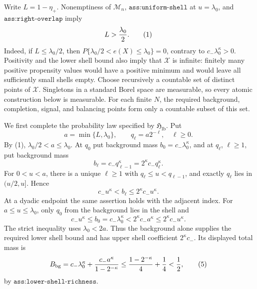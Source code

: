 Write \(L=1-\eta_+\).  Nonemptiness of \(\mathcal M_n\), \(\texttt{ass:uniform-shell}\) at \(u=\lambda_0\), and \(\texttt{ass:right-overlap}\) imply
\[
L>{\lambda_0\over2}.                                                     \tag{1}
\]
Indeed, if \(L\leq\lambda_0/2\), then \(P\{\lambda_0/2<e(X)\leq\lambda_0\}=0\), contrary to \(c_-\lambda_0^\kappa>0\).  Positivity and the lower shell bound also imply that \(\mathcal X\) is infinite: finitely many positive propensity values would have a positive minimum and would leave all sufficiently small shells empty.  Choose recursively a countable set of distinct points of \(\mathcal X\).  Singletons in a standard Borel space are measurable, so every atomic construction below is measurable.  For each finite \(N\), the required background, completion, signal, and balancing points form only a countable subset of this set.

We first complete the probability law specified by \(\mathfrak H_{\mathrm{lb}}\).  Put
\[
a=\min\{L,\lambda_0\},\qquad q_\ell=a2^{-\ell},\quad \ell\geq0.
\]
By (1), \(\lambda_0/2<a\leq\lambda_0\).  At \(q_0\) put background mass \(b_0=c_-\lambda_0^\kappa\), and at \(q_\ell\), \(\ell\geq1\), put background mass
\[
b_\ell=c_-q_{\ell-1}^\kappa=2^\kappa c_-q_\ell^\kappa.                  \tag{2}
\]
For \(0<u<a\), there is a unique \(\ell\geq1\) with \(q_\ell\leq u<q_{\ell-1}\), and exactly \(q_\ell\) lies in \((u/2,u]\).  Hence
\[
c_-u^\kappa<b_\ell\leq2^\kappa c_-u^\kappa.                            \tag{3}
\]
At a dyadic endpoint the same assertion holds with the adjacent index.  For \(a\leq u\leq\lambda_0\), only \(q_0\) from the background lies in the shell and
\[
c_-u^\kappa\leq b_0=c_-\lambda_0^\kappa
 <2^\kappa c_-a^\kappa\leq2^\kappa c_-u^\kappa.                         \tag{4}
\]
The strict inequality uses \(\lambda_0<2a\).  Thus the background alone supplies the required lower shell bound and has upper shell coefficient \(2^\kappa c_-\).  Its displayed total mass is
\[
B_{\mathrm{bg}}
=c_-\lambda_0^\kappa+{c_-a^\kappa\over1-2^{-\kappa}}
\leq {1-2^{-\kappa}\over4}+{1\over4}< {1\over2},                       \tag{5}
\]
by \(\texttt{ass:lower-shell-richness}\).

